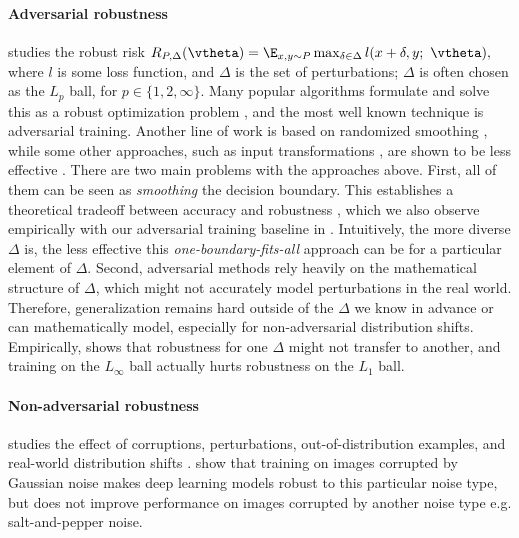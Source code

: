 \paragraph{Adversarial robustness}
studies the robust risk
$
R_{P, \Delta}(\vtheta) = \E_{x,y\sim P} \max_{\delta \in \Delta}  l(x+\delta, y; ~\vtheta),
$
where $l$ is some loss function, and $\Delta$ is the set of perturbations; $\Delta$ is often chosen as the $L_p$ ball, for $p\in \{1, 2, \infty\}$.
Many popular algorithms formulate and solve this as a robust optimization problem \citep{goodfellow2014explaining, madry2017towards, sinha2017certifying, raghunathan2018certified, wong2017provable, croce2018provable}, and the most well known technique is adversarial training.
Another line of work is based on randomized smoothing \citep{cohen2019certified, salman2019provably}, while some other approaches, such as input transformations
\citep{guo2017countering, song2017pixeldefend}, are shown to be less effective \citep{athalye2018obfuscated}.
There are two main problems with the approaches above.
First, all of them can be seen as \emph{smoothing} the decision boundary.
This establishes a theoretical tradeoff between accuracy and robustness \citep{tsipras2018robustness, zhang2019theoretically}, which we also observe empirically with our adversarial training baseline in .
Intuitively, the more diverse $\Delta$ is, the less effective this \emph{one-boundary-fits-all} approach can be for a particular element of $\Delta$.
Second, adversarial methods rely heavily on the mathematical structure of $\Delta$, which might not accurately model perturbations in the real world. 
Therefore, generalization remains hard outside of the $\Delta$ we know in advance or can mathematically model, especially for non-adversarial distribution shifts.
Empirically, \citet{kang2019transfer} shows that robustness for one $\Delta$ might not transfer to another, and training on the $L_\infty$ ball actually hurts robustness on the $L_1$ ball.

\paragraph{Non-adversarial robustness} studies the effect of corruptions, perturbations, out-of-distribution examples, and real-world distribution shifts
\citep{hendrycks2019improving, hendrycks2019using, hendrycks2018using, hendrycks2016baseline}.
\citet{geirhos2018generalisation} show that training on images corrupted by Gaussian noise makes deep learning models robust to this particular noise type, but does not improve performance on images corrupted by another noise type e.g. salt-and-pepper noise.

